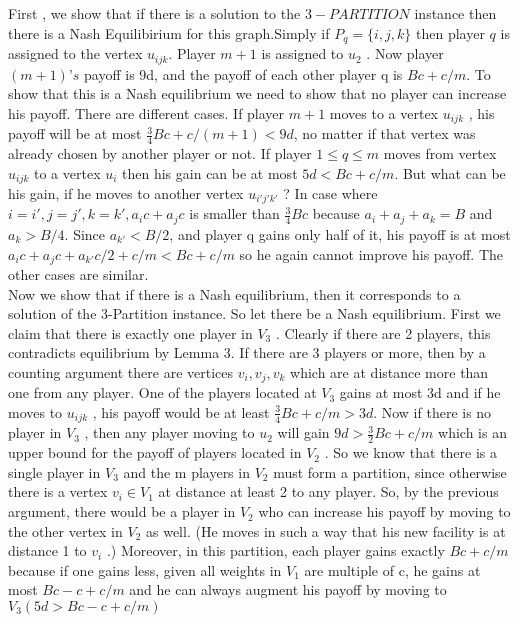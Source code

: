 \documentclass[12pt]{article}
\begin{document}
First , we show that if there is a solution to the $3-PARTITION$ instance then there is a Nash Equilibirium for this graph.Simply if $P_{q} = \lbrace i,j,k \rbrace$ then player $q$ is assigned to the vertex $u_{ijk}$.   Player $m + 1$ is assigned to $u_2$ . Now player $(m + 1)’s$ payoff is 9d, and the payoff of each other player q is $Bc + c/m$. To show that this is a Nash equilibrium we need to show that no player can increase his payoff. There are different cases. If player $m + 1$ moves to a vertex $u_{ijk}$ , his payoff will be at most $\frac{3}{4} Bc + c/(m + 1) < 9d$, no matter if that vertex was already chosen by another player or not. If player $1 \leq q\leq m$ moves from vertex $u_{ijk}$ to a vertex $u_i$ then his gain can be at most $5d < Bc + c/m$. But what can be his gain, if he moves to another vertex $u_{i'j'k'}$ ? In case where $i = i' , j = j' , k = k' , a_ic + a_jc$ is smaller than $\frac{3}{4} Bc$ because $a_i + a_j + a_k = B$ and $a_k > B/4$. Since $a_{k'} < B/2$, and player q gains only half of it, his payoff is at most $a_i c + a_j c + a_{k'} c/2 + c/m < Bc + c/m$ so he again cannot improve his payoff. The other cases are similar.\\

Now we show that if there is a Nash equilibrium, then it corresponds to a solution of the 3-Partition instance. So let there be a Nash equilibrium. First we claim that there is exactly one player in $V_3$ . Clearly if there are 2 players, this contradicts equilibrium by Lemma 3. If there are 3 players or more, then by a counting argument there are vertices $v_i , v_j , v_k$ which are at distance more than one from any player. One of the players located at $V_3$ gains at most 3d and if he moves to $u_{ijk}$ , his payoff would be at least $\frac{3}{4} Bc + c/m > 3d$. Now if there is no player in $V_3$ , then any player moving to $u_2$ will gain $9d > \frac{3}{2} Bc + c/m$ which is an upper bound for the payoff of players located in $V_2$ . So we know that there is a single player in $V_3$ and the m players in $V_2$ must form a partition, since otherwise there is a vertex $v_i \in V_1$ at distance at least 2 to any player. So, by the previous argument, there would be a player in $V_2$ who can increase his payoff by moving to the other vertex in $V_2$ as well. (He moves in such a way that his new facility is at distance 1 to $v_i$ .) Moreover, in this partition, each player gains exactly $Bc + c/m$ because if one gains less, given all weights in $V_1$ are multiple of c, he gains at most $Bc - c + c/m$ and he can always augment his payoff by moving to $V_3 (5d > Bc - c + c/m)$ \cite{Durr07nashequilibria} 
\\
\end{document}
